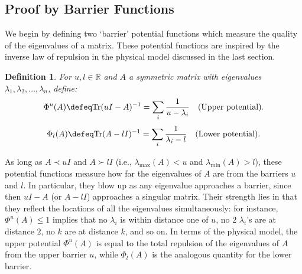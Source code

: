 \documentclass[12pt]{article}
\newcommand{\R}{\mathbb{R}}
\newtheorem{definition}[theorem]{Definition}
\newcommand{\lmin}{\lambda_\mathrm{min}}
\newcommand{\lmax}{\lambda_\mathrm{max}}
\newcommand{\tr}{\mathrm{Tr}}
\begin{document}
\subsection{Proof by Barrier Functions}
We begin by defining two `barrier' potential
  functions which measure the quality of the eigenvalues of a matrix. 
These potential functions are inspired by the inverse law 
  of repulsion in the physical model discussed in the last section.
\begin{definition}
For $u,l\in\R$ and $A$ a symmetric matrix with eigenvalues
$\lambda_1,\lambda_2,\ldots,\lambda_{n}$, define:
\[
   \Phi^u(A)\defeq\tr(uI-A)^{-1}
  =
   \sum_i\frac{1}{u-\lambda_i}
  \quad\textrm{(Upper potential)}.
\] 
\[
  \Phi_l(A)\defeq\tr(A-lI)^{-1}
  =
  \sum_i\frac{1}{\lambda_i-l}
   \quad\textrm{(Lower potential)}.\]
\end{definition}

As long as $A\prec uI$ and $A\succ lI$ (i.e., $\lmax(A)<u$ and $\lmin(A)>l$), these potential functions
  measure how far the eigenvalues of $A$ are from the barriers $u$ and $l$. 
In particular, they blow up as any eigenvalue approaches a
  barrier, since then $uI-A$ (or $A-lI$) approaches a singular matrix.
Their strength lies in that they reflect the locations of all the
  eigenvalues simultaneously: for instance, 
  $\Phi^{u}(A)\le 1$ implies that
  no $\lambda_i$ is within distance one of $u$, no $2$
  $\lambda_i$'s are at distance $2$, no $k$ are at distance $k$, and so on.
In terms of the physical model, the upper potential $\Phi^u(A)$ is equal to the total repulsion of the eigenvalues of
  $A$ from the upper barrier $u$, while $\Phi_l(A)$ is the analogous quantity for the lower barrier.
\end{document}
